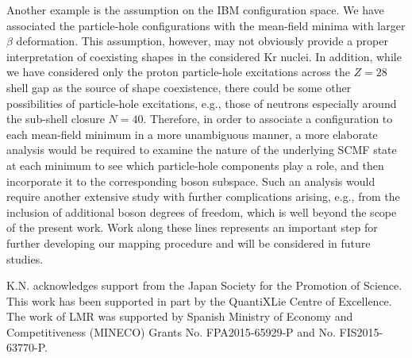 \documentclass[twocolumn,showpacs,amsmath,amssymb,superscriptaddress]{revtex4-1}
\begin{document}
Another example is the assumption on the IBM configuration space. 
We have associated the particle-hole configurations with the mean-field
minima with larger $\beta$ deformation. 
This assumption, however, may not obviously provide a proper 
interpretation of coexisting shapes in the considered Kr nuclei. 
In addition, while we have considered only the
proton particle-hole excitations across the $Z=28$ shell gap as the  
source of shape coexistence, there could be some other
possibilities of particle-hole excitations, e.g., those of neutrons
especially around the sub-shell closure $N=40$. 
Therefore, in order to associate a configuration to each mean-field minimum in a more
unambiguous manner, a more elaborate analysis would be required to
examine the nature of the underlying SCMF 
state at each minimum to see which particle-hole components play a role,
and then incorporate it to the corresponding boson subspace. 
Such an analysis would require 
another extensive study with further complications arising, e.g., from the
inclusion of additional boson degrees of freedom, which is well beyond
the scope of the present work. Work along these lines represents an
important step for further developing our
mapping procedure and will be considered in future studies. 


\acknowledgments
K.N. acknowledges support from the Japan 
Society for the Promotion of Science. This work has been supported in 
part by the QuantiXLie Centre of Excellence. The  work of LMR was 
supported by Spanish Ministry of Economy and Competitiveness (MINECO) Grants No. FPA2015-65929-P and
No. FIS2015-63770-P.



\end{document}
